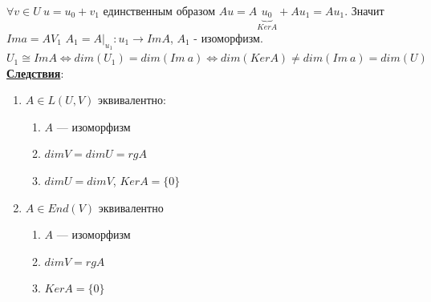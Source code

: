 \documentclass[12pt,a4paper]{article}
\newcommand{\bfline}[1]{\textbf{\underline{#1}}}
\begin{document}
$\forall v \in U\ u = u_0 + v_1$ единственным образом \newline
$A u = A \underset{Ker A}{\underbrace{u_0}} + A u_1 = A u_1$. Значит $Im a = A V_1$ \newline
$A_1 = A|_{u_1}: u_1 \rightarrow Im A$, $A_1$ - изоморфизм. \newline
$U_1 \cong Im A \Leftrightarrow dim(U_1) = dim(Im\ a) \Leftrightarrow dim(Ker A) \neq dim(Im\ a) = dim(U)$ \newline
\bfline{Следствия}:
\begin{enumerate}
	\item $A \in L(U, V)$ эквивалентно:
		\begin{enumerate}
			\item $A$ --- изоморфизм
			\item $dim V = dim U = rg A$
			\item $dim U = dim V$, $Ker A = \{0\}$
		\end{enumerate}
	\item $A \in End(V)$ эквивалентно
		\begin{enumerate}
			\item $A$ --- изоморфизм
			\item $dim V = rg A$
			\item $Ker A = \{0\}$
		\end{enumerate}
\end{enumerate}
\end{document}
